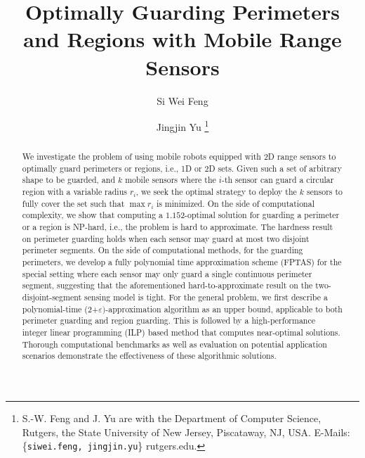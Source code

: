 \documentclass[letterpaper, 10 pt, conference]{formatting/ieeeconf}
\title{%
Optimally Guarding Perimeters and Regions with Mobile Range Sensors
}
\author{
Si Wei Feng  \and Jingjin Yu
 \thanks{
 S.-W. Feng and J. Yu are with the Department of Computer Science, 
 Rutgers, the State University of New Jersey, Piscataway, NJ, 
 USA. E-Mails: \{{\tt siwei.feng, jingjin.yu}\}\hspace*{.25em}
 \MVAt \hspace*{.25em}rutgers.edu. 
}
}
\newif\ifdraft
\newcommand{\sw}[1]{{}}
\theoremstyle{definition}
\theoremstyle{remark}
\begin{document}
\maketitle
\thispagestyle{empty}
\pagestyle{empty}

\ifdraft
\begin{picture}(0,0)%
\put(-12,105){
\framebox(505,40){\parbox{\dimexpr2\linewidth+\fboxsep-\fboxrule}{
\textcolor{blue}{
The file is formatted to look identical to the final compiled IEEE 
conference PDF, with additional margins added for making margin 
notes. Use $\backslash$todo$\{$...$\}$ for general side comments
and $\backslash$jy$\{$...$\}$ for JJ's comments. Set 
$\backslash$drafttrue to $\backslash$draftfalse to remove the 
formatting. 
}}}}
\end{picture}
\vspace*{-4mm}
\fi


\begin{abstract}
We investigate the problem of using mobile robots equipped with 2D range 
sensors to optimally guard perimeters or regions, i.e., 1D or 2D sets. 
%
Given such a set of arbitrary shape to be guarded, and $k$ mobile sensors 
where the $i$-th sensor can guard a circular region with a variable radius 
$r_i$, we seek the optimal strategy to deploy the $k$ sensors to fully 
cover the set such that $\max r_i$ is minimized. 
%
On the side of computational complexity, we show that computing a 
$1.152$-optimal solution for guarding a perimeter or a region is NP-hard, 
i.e., the problem is hard to approximate.
%
The hardness result on perimeter guarding holds when each sensor 
may guard at most two disjoint perimeter segments. 
%
On the side of computational methods, for the guarding perimeters, 
we develop a fully polynomial time approximation scheme (FPTAS) for the 
special setting where each sensor may only guard a single continuous 
perimeter segment, suggesting that the aforementioned hard-to-approximate 
result on the two-disjoint-segment sensing model is tight. 
%
For the general problem, we first describe a polynomial-time 
(2+$\varepsilon)$-approximation algorithm as an upper bound, applicable to 
both perimeter guarding and region guarding. 
%
This is followed by a high-performance integer linear programming (ILP) 
based method that computes near-optimal solutions. 
%
Thorough computational benchmarks as well as evaluation on potential 
application scenarios demonstrate the effectiveness of these algorithmic 
solutions. 
\end{abstract}
\end{document}
